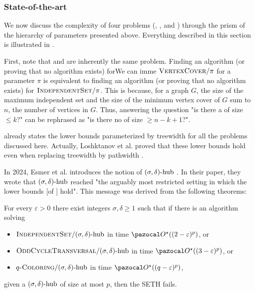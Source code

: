 \subsubsection*{State-of-the-art}



We now discuss the complexity of four problems (, ,  and ) through the prism of the hierarchy of parameters presented above. Everything described in this section is illustrated in .

\medskip

First, note that  and  are inherently the same problem. Finding an algorithm (or proving that no algorithm exists) forWe can imme $\textsc{VertexCover}/\pi$ for a parameter $\pi$ is equivalent to finding an algorithm (or proving that no algorithm exists) for $\textsc{IndependentSet}/\pi$. This is because, for a graph $G$, the size of the maximum independent set and the size of the minimum vertex cover of $G$ sum to $n$, the number of vertices in $G$. Thus, answering the question "is there a  of size $\leq k$?" can be rephrased as "is there no  of size $\geq n - k + 1$?".

\medskip

 already states the lower bounds parameterized by treewidth for all the problems discussed here. Actually, Loshktanov et al. proved that these lower bounds hold even when replacing treewidth by pathwidth \cite{lokshtanov2011known}.

In 2024, Esmer et al. introduces the notion of $(\sigma, \delta)\text{-hub}$ \cite{esmer2024fundamental}. In their paper, they wrote that $(\sigma, \delta)\text{-hub}$ reached "the arguably most restricted setting in which the lower bounds [of \cite{lokshtanov2011known}] hold". This message was derived from the following theorems:

\begin{theorem}
    \label{theorem:sdhub-lowerbounds}
    For every $\varepsilon > 0$ there exist integers $\sigma, \delta \geq 1$ such that if there is an algorithm solving
    \begin{itemize}
        \item $\textsc{IndependentSet}/(\sigma, \delta)\text{-hub}$ in time $\O^\star((2 - \varepsilon)^p)$, or
        \item $\textsc{OddCycleTransversal}/(\sigma, \delta)\text{-hub}$ in time $\O^\star((3 - \varepsilon)^p)$, or
        \item $q\textsc{-Coloring}/(\sigma, \delta)\text{-hub}$ in time $\O^\star((q - \varepsilon)^p)$,
    \end{itemize}
    given a $(\sigma, \delta)\text{-hub}$ of size at most $p$, then the SETH fails.
\end{theorem}

